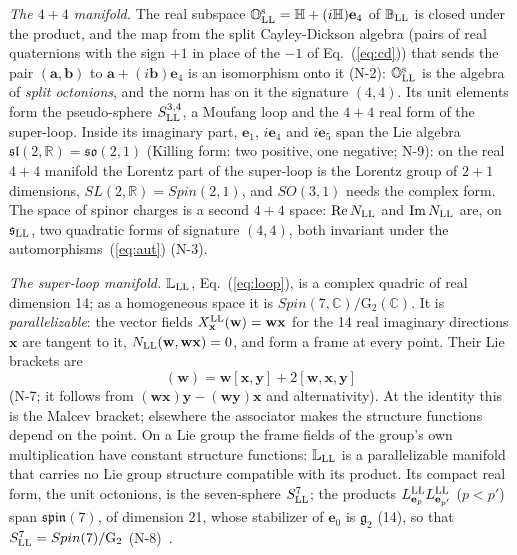 \emph{The $4+4$ manifold.} The real subspace $\mathbb O^{\rm s}_{\rm LL}=\mathbb H+(i\mathbb H)\mathbf
e_4$ of $\mathbb B_{\rm LL}$ is closed under the product, and the map from the split Cayley-Dickson
algebra (pairs of real quaternions with the sign $+1$ in place of the $-1$ of Eq.~(\ref{eq:cd})) that
sends the pair $(\mathbf a,\mathbf b)$ to $\mathbf a+(i\mathbf b)\mathbf e_4$ is an isomorphism onto it
(N-2): $\mathbb O^{\rm s}_{\rm LL}$ is the algebra of \emph{split octonions}, and the norm has on it the
signature $(4,4)$. Its unit elements form the pseudo-sphere $S^{3,4}_{\rm LL}$, a Moufang loop and the
$4+4$ real form of the super-loop. Inside its imaginary part, $\mathbf e_1$, $i\mathbf e_4$ and
$i\mathbf e_5$ span the Lie algebra $\mathfrak{sl}(2,\mathbb R)=\mathfrak{so}(2,1)$ (Killing form: two
positive, one negative; N-9): on the real $4+4$ manifold the Lorentz part of the super-loop is the
Lorentz group of $2+1$ dimensions, $SL(2,\mathbb R)=Spin(2,1)$, and $SO(3,1)$ needs the complex form.
The space of spinor charges is a second $4+4$ space: $\mathrm{Re}\,N_{\rm LL}$ and $\mathrm{Im}\,N_{\rm
LL}$ are, on $\mathfrak s_{\rm LL}$, two quadratic forms of signature $(4,4)$, both invariant under the
automorphisms~(\ref{eq:aut}) (N-3).

\emph{The super-loop manifold.} $\mathbb L_{\rm LL}$, Eq.~(\ref{eq:loop}), is a complex quadric of real
dimension 14; as a homogeneous space it is $Spin(7,\mathbb C)/\mathrm G_2(\mathbb C)$. It is
\emph{parallelizable}: the vector fields $X^{\rm LL}_{\mathbf x}(\mathbf w)=\mathbf w\mathbf x$ for the 14
real imaginary directions $\mathbf x$ are tangent to it, $N_{\rm LL}(\mathbf w,\mathbf w\mathbf x)=0$, and
form a frame at every point. Their Lie brackets are
\begin{equation}
[X^{\rm LL}_{\mathbf x},X^{\rm LL}_{\mathbf y}](\mathbf w)=\mathbf w[\mathbf x,\mathbf y]+2[\mathbf w,\mathbf x,\mathbf y]
\label{eq:frames}
\end{equation}
(N-7; it follows from $(\mathbf w\mathbf x)\mathbf y-(\mathbf w\mathbf y)\mathbf x$ and alternativity).
At the identity this is the Malcev bracket; elsewhere the associator makes the structure functions
depend on the point. On a Lie group the frame fields of the group's own multiplication have constant
structure functions: $\mathbb L_{\rm LL}$ is a parallelizable manifold that carries no Lie group
structure compatible with its product. Its compact real form, the unit octonions, is the seven-sphere
$S^7_{\rm LL}$; the products $L^{\rm LL}_{\mathbf e_p}L^{\rm LL}_{\mathbf e_{p'}}$ ($p<p'$) span
$\mathfrak{spin}(7)$, of dimension 21, whose stabilizer of $\mathbf e_0$ is $\mathfrak g_2$ (14), so that
$S^7_{\rm LL}=Spin(7)/\mathrm G_2$ (N-8)~\cite{Baez2002}.

